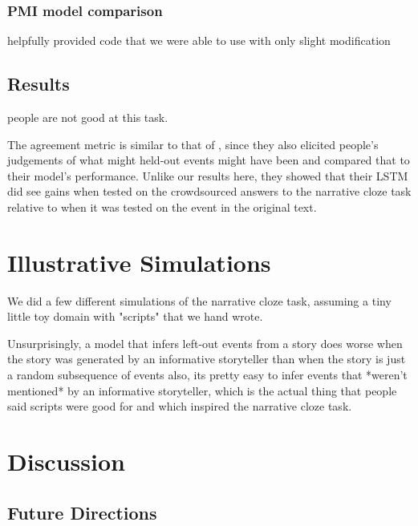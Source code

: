 \documentclass[10pt,a4paper]{article}
\newcommand{\todo}[1]{{\color{red}#1}}
\begin{document}
\subsubsection{PMI model comparison}

\todo{
 helpfully provided code that we were able to use with only slight modification
}

\subsection{Results}

\todo{people are not good at this task.}

The agreement metric is similar to that of , since they also elicited people's judgements of what might held-out events might have been and compared that to their model's performance. Unlike our results here, they showed that their LSTM did see gains when tested on the crowdsourced answers to the narrative cloze task relative to when it was tested on the event in the original text.

\section{Illustrative Simulations}

\todo{
We did a few different simulations of the narrative cloze task, assuming a tiny little toy domain with "scripts" that we hand wrote.

Unsurprisingly,
a model that infers left-out events from a story does worse when the story was generated by an informative storyteller than when the story is just a random subsequence of events
also, its pretty easy to infer events that *weren't mentioned* by an informative storyteller, which is the actual thing that people said scripts were good for and which inspired the narrative cloze task.
}

\section{Discussion}

\subsection{Future Directions}
\end{document}
